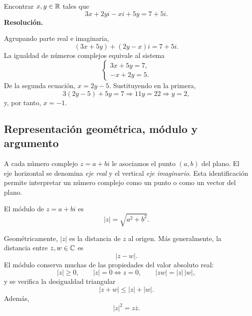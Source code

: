 \begin{solvedexercise}
Encontrar \(x,y\in\mathbb{R}\) tales que
\[
3x+2yi-xi+5y=7+5i.
\]
\tcblower
\textbf{Resolución.}\par\smallskip
Agrupando parte real e imaginaria,
\[
(3x+5y)+(2y-x)i=7+5i.
\]
La igualdad de números complejos equivale al sistema
\[
\begin{cases}
3x+5y=7,\\
-x+2y=5.
\end{cases}
\]
De la segunda ecuación, \(x=2y-5\). Sustituyendo en la primera,
\[
3(2y-5)+5y=7\Longrightarrow11y=22\Longrightarrow y=2,
\]
y, por tanto, \(x=-1\).
\end{solvedexercise}

\subsection{Representación geométrica, módulo y argumento}

A cada número complejo \(z=a+bi\) le asociamos el punto \((a,b)\) del plano. El eje horizontal se denomina \emph{eje real} y el vertical \emph{eje imaginario}. Esta identificación permite interpretar un número complejo como un punto o como un vector del plano.

\begin{center}
\end{center}

\begin{definition}[Módulo]
El módulo de \(z=a+bi\) es
\[
|z|=\sqrt{a^2+b^2}.
\]
\end{definition}

Geométricamente, \(|z|\) es la distancia de \(z\) al origen. Más generalmente, la distancia entre \(z,w\in\mathbb{C}\) es
\[
|z-w|.
\]
El módulo conserva muchas de las propiedades del valor absoluto real:
\[
|z|\geq0,
\qquad
|z|=0\Longleftrightarrow z=0,
\qquad
|zw|=|z|\,|w|,
\]
y se verifica la desigualdad triangular
\[
|z+w|\leq|z|+|w|.
\]
Además,
\[
|z|^2=z\overline z.
\]

